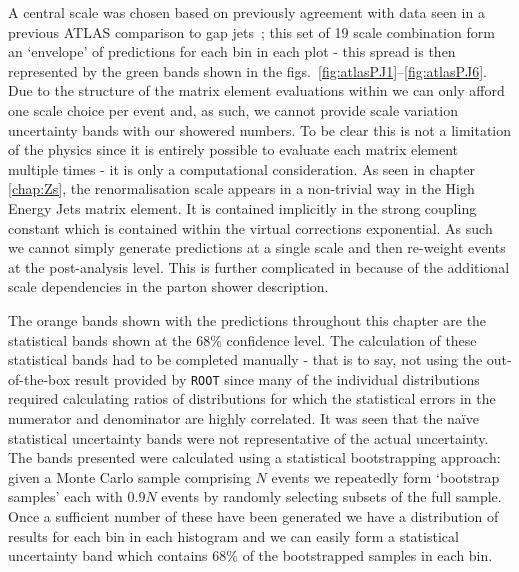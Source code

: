 	A central scale was chosen based on previously agreement with data seen in a previous
	ATLAS comparison to gap jets~\cite{Aad:2011jz}; this set of 19 scale combination
	form an `envelope' of predictions for each bin in each plot - this spread is then
	represented by the green bands shown in the figs.~\eqref{fig:atlasPJ1}--\eqref{fig:atlasPJ6}.
	Due to the structure of the matrix element evaluations within \HEJA
	we can only afford one scale choice per event and, as such, we cannot provide
	scale variation uncertainty bands with our showered numbers.  To be clear this
	is not a limitation of the physics since it is entirely possible to evaluate
	each matrix element multiple times - it is only a computational consideration.
	As seen in chapter \ref{chap:Zs}, the renormalisation scale appears in a non-trivial way
	in the High Energy Jets matrix element.  It is contained implicitly in the strong coupling
	constant which is contained within the virtual corrections exponential.  As such
	we cannot simply generate predictions at a single scale and then re-weight events
	at the post-analysis level.  This is further complicated in \HEJA because of the
	additional scale dependencies in the parton shower description.

	The orange bands shown with the \HEJA predictions throughout this chapter are the
	statistical bands shown at the 68\% confidence level.  The calculation
	of these statistical bands had to be completed manually - that is to say, not using
	the out-of-the-box result provided by \texttt{ROOT} since many of the individual
	distributions required calculating ratios of distributions for which the statistical
	errors in the numerator and denominator are highly correlated.  It was seen that the
	na\"ive statistical uncertainty bands were not representative of the actual uncertainty.
	The bands presented were calculated using a statistical bootstrapping approach: given
	a Monte Carlo sample comprising $N$ events we repeatedly form `bootstrap samples'
	each with $0.9N$ events by randomly selecting subsets of the full sample.  Once
	a sufficient number of these have been generated we have a distribution of results for
	each bin in each histogram and we can easily form a statistical uncertainty band
	which contains 68\% of the bootstrapped samples in each bin.

